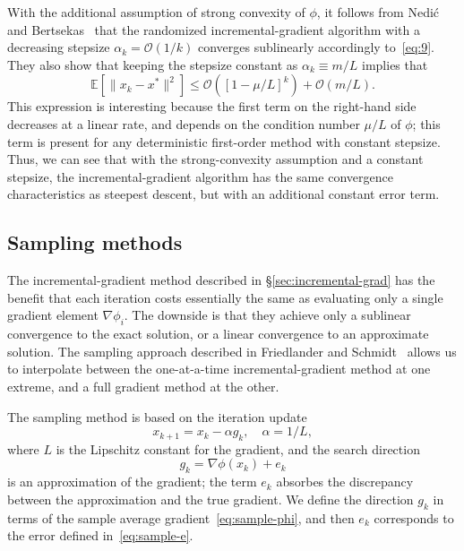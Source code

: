 \documentclass[nospthms]{svjour3}
\numberwithin{equation}{section}
\def\norm#1{\|#1\|}
\def\k{_k}
\def\kp#1{_{k+#1}}
\def\xstar{x^*}
\def\Oscr{\mathcal{O}}
\def\expval{\mathbb{E}}
\begin{document}
With the additional assumption of strong convexity of $\phi$, it
follows from Nedi\'c and Bertsekas~\cite{nedic2000convergence} that
the randomized incremental-gradient algorithm with a decreasing
stepsize $\alpha\k=\Oscr(1/k)$ converges sublinearly accordingly
to~\eqref{eq:9}. They also show that keeping the stepsize constant as
$\alpha\k\equiv m/L$ implies that
\begin{equation*}
\expval[\norm{x\k-\xstar}^2] \le \Oscr([1-\mu/L]^k) + \Oscr(m/L).
\end{equation*}
This expression is interesting because the first term on the
right-hand side decreases at a linear rate, and depends on the
condition number $\mu/L$ of $\phi$; this term is present for any
deterministic first-order method with constant stepsize. Thus, we can
see that with the strong-convexity assumption and a constant stepsize,
the incremental-gradient algorithm has the same convergence
characteristics as steepest descent, but with an additional constant
error term.







\subsection{Sampling methods}
\label{sec:sampling-opt}

The incremental-gradient method described in
\S\ref{sec:incremental-grad} has the benefit that each iteration costs
essentially the same as evaluating only a single gradient element
$\nabla\phi_i$. The downside is that they achieve only a sublinear
convergence to the exact solution, or a linear convergence to an
approximate solution. The sampling approach described in Friedlander
and Schmidt~\cite{FS:2011} allows us to interpolate between the
one-at-a-time incremental-gradient method at one extreme, and a full
gradient method at the other.

The sampling method is based on the iteration update
\begin{equation}
  \label{eq:10}
  x\kp1 = x\k - \alpha g\k, \quad \alpha = 1/L,
\end{equation}
where $L$ is the Lipschitz constant for the gradient, and the search
direction
\begin{equation}
  \label{eq:11}
  g\k = \nabla\phi(x\k) + e\k
\end{equation}
is an approximation of the gradient; the term $e\k$ absorbes the
discrepancy between the approximation and the true gradient.  We
define the direction $g\k$ in terms of the sample average
gradient~\eqref{eq:sample-phi}, and then $e\k$ corresponds to the
error defined in~\eqref{eq:sample-e}.
\end{document}
